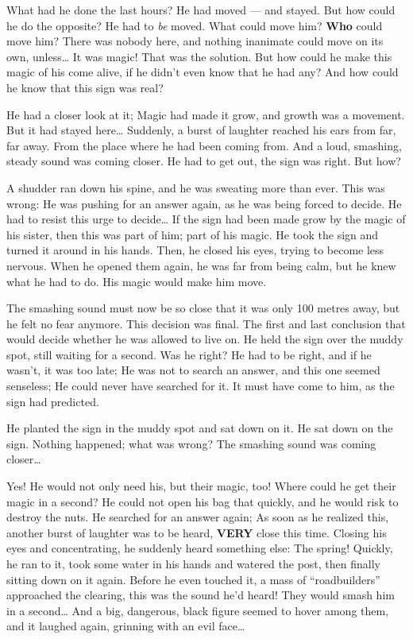 What had he done the last hours? He had moved --- and stayed. But how could he do the opposite? 
He had to \emph{be} moved. What could move him? \textbf{Who} could move him? There was nobody here, and nothing inanimate could move on its own, unless\dots
It was magic! That was the solution. But how could he make this magic of his come alive, if he didn't even know that he had any?
And how could he know that this sign was real?

He had a closer look at it; Magic had made it grow, and growth was a movement. But it had stayed here\dots
Suddenly, a burst of laughter reached his ears from far, far away. 
From the place where he had been coming from. 
And a loud, smashing, steady sound was coming closer. He had to get out, the sign was right. But how?

A shudder ran down his spine, and he was sweating more than ever. This was wrong: He was pushing for an answer again, as he was being forced to decide. He had to resist this urge to decide\dots
If the sign had been made grow by the magic of his sister, then this was part of him; part of his magic.
He took the sign and turned it around in his hands. Then, he closed his eyes, trying to become less nervous. When he opened them again, he was far from being calm, but he knew what he had to do. 
His magic would make him move.

The smashing sound must now be so close that it was only 100 metres away, but he felt no fear anymore. This decision was final. 
The first and last conclusion that would decide whether he was allowed to live on. 
He held the sign over the muddy spot, still waiting for a second. Was he right? He had to be right, and if he wasn't, it was too late; He was not to search an answer, and this one seemed senseless; He could never have searched for it. 
It must have come to him, as the sign had predicted.

He planted the sign in the muddy spot and sat down on it. He sat down on the sign. Nothing happened; what was wrong? 
The smashing sound was coming closer\dots

Yes! He would not only need his, but their magic, too!
Where could he get their magic in a second? He could not open his bag that quickly, and he would risk to destroy the nuts. He searched for an answer again; As soon as he realized this, another burst of laughter was to be heard, \textbf{VERY} close this time. 
Closing his eyes and concentrating, he suddenly heard something else: The spring! Quickly, he ran to it, took some water in his hands and watered the post, then finally sitting down on it again. 
Before he even touched it, a mass of \enquote{roadbuilders} approached the clearing, this was the sound he'd heard! They would smash him in a second\dots
And a big, dangerous, black figure seemed to hover among them, and it laughed again, grinning with an evil face\dots

